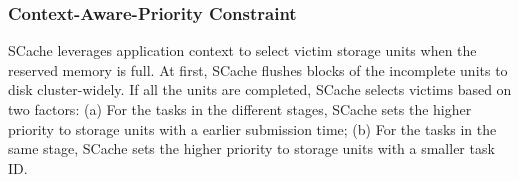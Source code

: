 \subsubsection{Context-Aware-Priority Constraint}
{\color{black}
SCache leverages application context to select victim storage units when the reserved memory is full.
At first, SCache flushes blocks of the incomplete units to disk cluster-widely.
If all the units are completed, SCache selects victims based on two factors: 
(a) For the tasks in the different stages, SCache sets the higher priority to storage units with a earlier submission time;
(b) For the tasks in the same stage, SCache sets the higher priority to storage units with a smaller task ID.
}


